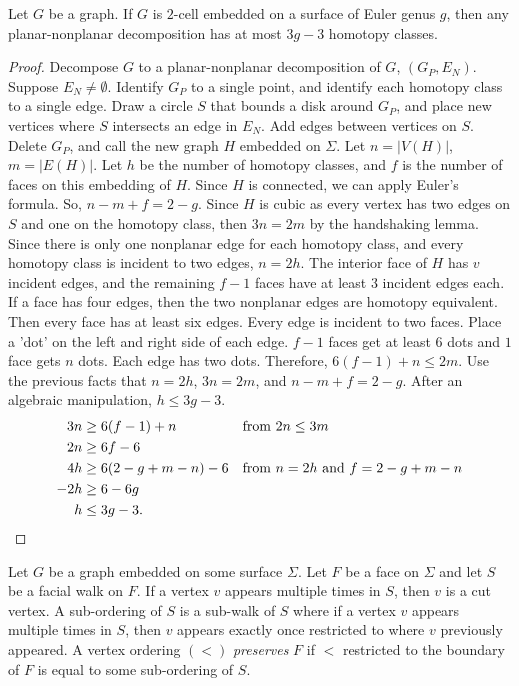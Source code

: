 \begin{lemma}
	Let $G$ be a graph. If \(G\) is \(2\)-cell embedded on a surface of Euler genus \(g\), then any planar-nonplanar decomposition has at most \(3g-3\) homotopy classes. 
\end{lemma}
\begin{proof}
	Decompose \(G\) to a planar-nonplanar decomposition of \(G\), \((G_P, E_N)\). Suppose \(E_N \neq \emptyset\). Identify \(G_P\) to a single point, and identify each homotopy class to a single edge. Draw a circle $S$ that bounds a disk around \(G_P\), and place new vertices where $S$ intersects an edge in $E_N$. Add edges between vertices on $S$. Delete \(G_P\), and call the new graph \(H\) embedded on $\Sigma$. Let \(n = |V(H)|\), \(m = |E(H)|\). Let \(h\) be the number of homotopy classes, and \(f\) is the number of faces on this embedding of $H$. Since $H$ is connected, we can apply Euler's formula. So, \(n - m + f = 2 - g\). Since \(H\) is cubic as every vertex has two edges on $S$ and one on the homotopy class, then \(3n = 2m\) by the handshaking lemma. Since there is only one nonplanar edge for each homotopy class, and every homotopy class is incident to two edges, \(n = 2h\). The interior face of \(H\) has \(v\) incident edges, and the remaining \(f-1\) faces have at least 3 incident edges each. If a face has four edges, then the two nonplanar edges are homotopy equivalent. Then every face has at least six edges. Every edge is incident to two faces. Place a 'dot' on the left and right side of each edge. $f-1$ faces get at least $6$ dots and $1$ face gets $n$ dots. Each edge has two dots. Therefore, \(  6(f-1) + n \leq 2m \). Use the previous facts that $n = 2h$, $3n = 2m$, and $n - m + f = 2 - g$. After an algebraic manipulation, \(h \leq 3g - 3 \). 
	\begin{align*}
		3n  & \geq 6(f - 1) + n         && \text{from } 2n \leq 3m \\
		2n  & \geq 6f - 6               \\
		4h  & \geq 6(2 - g + m - n) - 6 && \text{from } n = 2h \text{ and } f = 2 - g + m - n\\
		-2h & \geq 6 - 6g               \\
		h   & \leq 3g - 3. 
		&&\mbox{}\hfill \qedhere
	\end{align*}
\end{proof}

Let \(G\) be a graph embedded on some surface $\Sigma$. Let $F$ be a face on $\Sigma$ and let $S$ be a facial walk on $F$. If a vertex $v$ appears multiple times in $S$, then $v$ is a cut vertex. A sub-ordering of $S$ is a sub-walk of $S$ where if a vertex $v$ appears multiple times in $S$, then $v$ appears exactly once restricted to where $v$ previously appeared. A vertex ordering \((<)\) \textit{preserves} \(F\) if $<$ restricted to the boundary of $F$ is equal to some sub-ordering of $S$.

